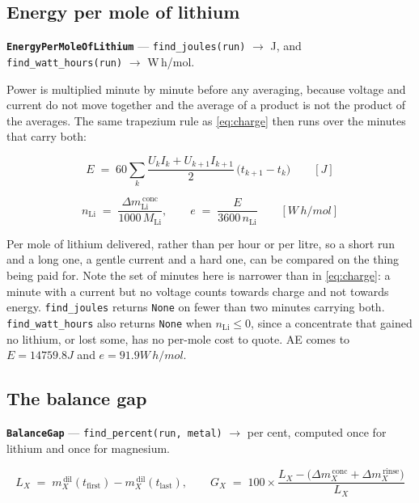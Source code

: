 \subsection{Energy per mole of lithium}

\textbf{\texttt{EnergyPerMoleOfLithium}} --- \texttt{find\_joules(run)} $\rightarrow$ J, and
\texttt{find\_watt\_hours(run)} $\rightarrow$ W\,h/mol.

Power is multiplied minute by minute before any averaging, because voltage and current do not
move together and the average of a product is not the product of the averages. The same
trapezium rule as \eqref{eq:charge} then runs over the minutes that carry both:

\begin{equation}
  E \;=\; 60 \sum_{k} \frac{U_k I_k + U_{k+1} I_{k+1}}{2}\,\bigl(t_{k+1} - t_k\bigr)
  \qquad [\unit{J}]
  \label{eq:energy}
\end{equation}

\begin{equation}
  n_\mathrm{Li} \;=\; \frac{\Delta m_\mathrm{Li}^{\,\mathrm{conc}}}{1000\,M_\mathrm{Li}},
  \qquad
  e \;=\; \frac{E}{3600\,n_\mathrm{Li}}
  \qquad [\unit{W\,h/mol}]
  \label{eq:energy-per-mole}
\end{equation}

Per mole of lithium delivered, rather than per hour or per litre, so a short run and a long one,
a gentle current and a hard one, can be compared on the thing being paid for. Note the set of
minutes here is narrower than in \eqref{eq:charge}: a minute with a current but no voltage counts
towards charge and not towards energy. \texttt{find\_joules} returns \texttt{None} on fewer than
two minutes carrying both. \texttt{find\_watt\_hours} also returns \texttt{None} when
$n_\mathrm{Li} \le 0$, since a concentrate that gained no lithium, or lost some, has no per-mole
cost to quote. AE comes to $E = 14759.8\unit{J}$ and $e = 91.9\unit{W\,h/mol}$.

\subsection{The balance gap}

\textbf{\texttt{BalanceGap}} --- \texttt{find\_percent(run, metal)} $\rightarrow$ per cent,
computed once for lithium and once for magnesium.

\begin{equation}
  L_X \;=\; m_X^{\,\mathrm{dil}}(t_\mathrm{first}) - m_X^{\,\mathrm{dil}}(t_\mathrm{last}),
  \qquad
  G_X \;=\; 100 \times
  \frac{L_X - \bigl(\Delta m_X^{\,\mathrm{conc}} + \Delta m_X^{\,\mathrm{rinse}}\bigr)}{L_X}
  \label{eq:gap}
\end{equation}

